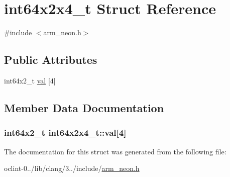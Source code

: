 \hypertarget{structint64x2x4__t}{\section{int64x2x4\-\_\-t Struct Reference}
\label{structint64x2x4__t}
}


{\ttfamily \#include $<$arm\-\_\-neon.\-h$>$}

\subsection*{Public Attributes}
\begin{DoxyCompactItemize}
\item 
int64x2\-\_\-t \hyperlink{structint64x2x4__t_a12bccff31bd70b0e000d643fb7ac8948}{val} \mbox{[}4\mbox{]}
\end{DoxyCompactItemize}


\subsection{Member Data Documentation}
\hypertarget{structint64x2x4__t_a12bccff31bd70b0e000d643fb7ac8948}{
\subsubsection[{val}]{\setlength{\rightskip}{0pt plus 5cm}int64x2\-\_\-t int64x2x4\-\_\-t\-::val\mbox{[}4\mbox{]}}}\label{structint64x2x4__t_a12bccff31bd70b0e000d643fb7ac8948}


The documentation for this struct was generated from the following file\-:\begin{DoxyCompactItemize}
\item 
oclint-\/0../lib/clang/3../include/\hyperlink{arm__neon_8h}{arm\-\_\-neon.\-h}\end{DoxyCompactItemize}
